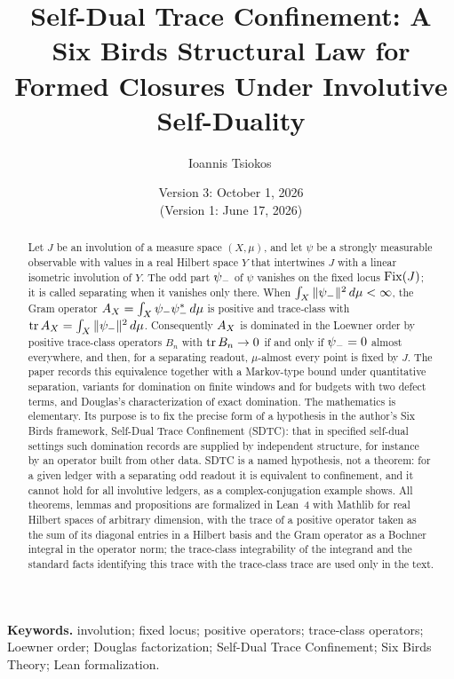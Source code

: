 \documentclass[11pt]{article}
\title{Self-Dual Trace Confinement: A Six Birds Structural Law for Formed Closures Under Involutive Self-Duality}
\author{Ioannis Tsiokos\,\orcidlink{0009-0009-7659-5964}}
\date{Version 3: October 1, 2026\\[2pt] \footnotesize (Version 1: June 17, 2026)}
\theoremstyle{definition}
\begin{document}
\maketitle
\thispagestyle{firstpage}

\begin{abstract}
Let \(J\) be an involution of a measure space \((X,\mu)\), and let
\(\psi\) be a strongly measurable observable with values in a real
Hilbert space \(Y\) that intertwines \(J\) with a linear isometric
involution of \(Y\).  The odd part \(\psi_{-}\) of \(\psi\) vanishes on
the fixed locus \(\operatorname{Fix}(J)\); it is called separating when it vanishes
only there.  When \(\int_X\|\psi_{-}\|^2\,d\mu<\infty\), the Gram operator
\(A_{X}=\int_X\psi_{-}\psi_{-}^*\,d\mu\) is positive and trace-class with
\(\operatorname{tr}A_{X}=\int_X\|\psi_{-}\|^2\,d\mu\).  Consequently \(A_{X}\) is
dominated in the Loewner order by positive trace-class operators
\(B_n\) with \(\operatorname{tr} B_n\to0\) if and only if \(\psi_{-}=0\) almost
everywhere, and then, for a separating readout, \(\mu\)-almost every
point is fixed by \(J\).  The paper records this equivalence together
with a Markov-type bound under quantitative separation, variants for
domination on finite windows and for budgets with two defect terms,
and Douglas's characterization of exact domination.  The mathematics is
elementary.  Its purpose is to fix the precise form of a hypothesis in
the author's Six Birds framework, Self-Dual Trace Confinement (SDTC):
that in specified self-dual settings such domination records are
supplied by independent structure, for instance by an operator built
from other data.  SDTC is a named hypothesis, not a theorem: for a
given ledger with a separating odd readout it is equivalent to
confinement, and it cannot hold for all involutive ledgers, as a
complex-conjugation example shows.  All theorems, lemmas and
propositions are formalized in Lean~4 with Mathlib for real Hilbert
spaces of arbitrary dimension, with the trace of a positive operator
taken as the sum of its diagonal entries in a Hilbert basis and the
Gram operator as a Bochner integral in the operator norm; the
trace-class integrability of the integrand and the standard facts
identifying this trace with the trace-class trace are used only in the
text.
\end{abstract}

\medskip
\noindent\textbf{Keywords.} involution; fixed locus; positive operators; trace-class operators; Loewner order; Douglas factorization; Self-Dual Trace Confinement; Six Birds Theory; Lean formalization.













\appendix
{}



\clearpage


\end{document}
